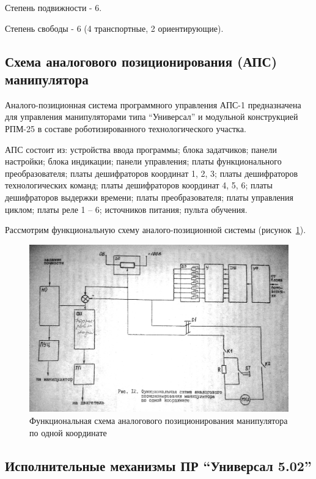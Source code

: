 Степень подвижности - 6.

Степень свободы - 6 (4 транспортные, 2 ориентирующие).

\subsection*{Схема аналогового позиционирования (АПС) манипулятора}

Аналого-позиционная система программного управления АПС-1 предназначена для управления манипуляторами типа ``Универсал'' и модульной конструкцией РПМ-25 в составе роботизированного технологического участка.

АПС состоит из: устройства ввода программы; блока задатчиков; панели настройки; блока индикации; панели управления; платы функционального преобразователя; платы дешифраторов координат 1, 2, 3; платы дешифраторов технологических команд; платы дешифраторов координат 4, 5, 6; платы дешифраторов выдержки времени; платы преобразователя; платы управления циклом; платы реле 1 -- 6; источников питания; пульта обучения.

Рассмотрим функциональную схему аналого-позиционной системы (рисунок~\ref{fig:functional}).

\begin{figure}[ht]
    \includegraphics[width=1\linewidth]{Figures/functional.png}
    \caption{Функциональная схема аналогового позиционирования манипулятора по одной координате}
    \label{fig:functional}
\end{figure}

\subsection*{Исполнительные механизмы ПР ``Универсал 5.02''}

